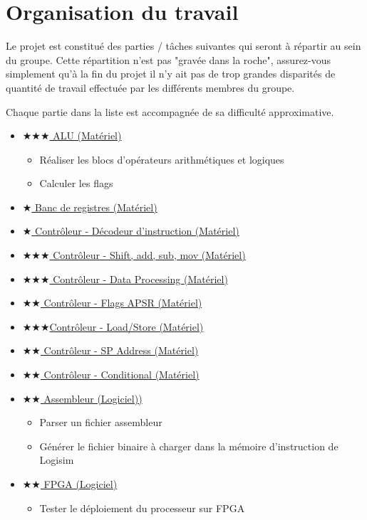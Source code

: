 \documentclass{article}
\begin{document}
    \section{Organisation du travail}

    Le projet est constitué des parties / tâches suivantes qui seront à répartir au sein du groupe.
    Cette répartition n'est pas "gravée dans la roche", assurez-vous simplement qu'à la fin du projet il n'y ait pas de trop grandes disparités de quantité de travail effectuée par les différents membres du groupe.

    Chaque partie dans la liste est accompagnée de sa difficulté approximative.

    \begin{itemize}
        \item \hyperref[sec:ALU]{$\bigstar\bigstar\bigstar$ ALU (Matériel)}
        \begin{itemize}
            \item Réaliser les blocs d'opérateurs arithmétiques et logiques
            \item Calculer les flags
        \end{itemize}
        \item \hyperref[sec:BDR]{$\bigstar$ Banc de registres (Matériel)}
        \item \hyperref[sec:OpDec]{$\bigstar$ Contrôleur - Décodeur d'instruction (Matériel)}
        \item \hyperref[sec:SASM]{$\bigstar\bigstar\bigstar$ Contrôleur - Shift, add, sub, mov (Matériel)}
        \item \hyperref[sec:DataProc]{$\bigstar\bigstar\bigstar$ Contrôleur - Data Processing (Matériel)}
        \item \hyperref[sec:FlagsAPSR]{$\bigstar\bigstar$ Contrôleur - Flags APSR (Matériel)}
        \item \hyperref[sec:LoadStore]{$\bigstar\bigstar\bigstar$Contrôleur - Load/Store (Matériel)}
        \item \hyperref[sec:SPAddr]{$\bigstar\bigstar$ Contrôleur - SP Address (Matériel)}
        \item \hyperref[sec:Conditional]{$\bigstar\bigstar$ Contrôleur - Conditional (Matériel)}
        \item \hyperref[sec:ASM]{$\bigstar\bigstar$ Assembleur (Logiciel))}
        \begin{itemize}
            \item Parser un fichier assembleur
            \item Générer le fichier binaire à charger dans la mémoire d'instruction de Logisim
        \end{itemize}
        \item \hyperref[sec:FPGA]{$\bigstar\bigstar$ FPGA (Logiciel)}
        \begin{itemize}
            \item Tester le déploiement du processeur sur FPGA
        \end{itemize}
    \end{itemize}
\end{document}
